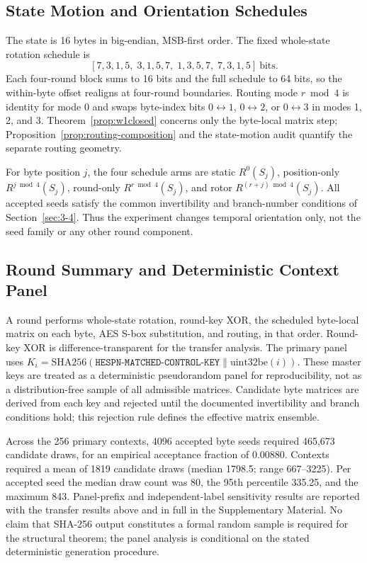 \documentclass[cryptography,article,submit,oneauthor]{Definitions/mdpi}
\begin{document}
\subsection{State Motion and Orientation Schedules}\label{sec:4-1}
The state is 16 bytes in big-endian, MSB-first order. The fixed whole-state rotation schedule is
\[
[7,3,1,5,\;3,1,5,7,\;1,3,5,7,\;7,3,1,5]\ \text{bits}.
\]
Each four-round block sums to 16 bits and the full schedule to 64 bits, so the within-byte offset realigns at four-round boundaries. Routing mode $r\bmod4$ is identity for mode 0 and swaps byte-index bits $0\leftrightarrow1$, $0\leftrightarrow2$, or $0\leftrightarrow3$ in modes 1, 2, and 3. Theorem~\ref{prop:w1closed} concerns only the byte-local matrix step; Proposition~\ref{prop:routing-composition} and the state-motion audit quantify the separate routing geometry.

For byte position $j$, the four schedule arms are static $R^0(S_j)$, position-only $R^{j\bmod4}(S_j)$, round-only $R^{r\bmod4}(S_j)$, and rotor $R^{(r+j)\bmod4}(S_j)$. All accepted seeds satisfy the common invertibility and branch-number conditions of Section~\ref{sec:3-4}. Thus the experiment changes temporal orientation only, not the seed family or any other round component.

\subsection{Round Summary and Deterministic Context Panel}\label{sec:4-2}
A round performs whole-state rotation, round-key XOR, the scheduled byte-local matrix on each byte, AES S-box substitution, and routing, in that order. Round-key XOR is difference-transparent for the transfer analysis. The primary panel uses $K_i=\mathrm{SHA256}(\texttt{HESPN-MATCHED-CONTROL-KEY}\parallel\mathrm{uint32be}(i))$. These master keys are treated as a deterministic pseudorandom panel for reproducibility, not as a distribution-free sample of all admissible matrices. Candidate byte matrices are derived from each key and rejected until the documented invertibility and branch conditions hold; this rejection rule defines the effective matrix ensemble.

Across the 256 primary contexts, 4096 accepted byte seeds required 465,673 candidate draws, for an empirical acceptance fraction of $0.00880$. Contexts required a mean of 1819 candidate draws (median 1798.5; range 667--3225). Per accepted seed the median draw count was 80, the 95th percentile 335.25, and the maximum 843. Panel-prefix and independent-label sensitivity results are reported with the transfer results above and in full in the Supplementary Material. No claim that SHA-256 output constitutes a formal random sample is required for the structural theorem; the panel analysis is conditional on the stated deterministic generation procedure.
\end{document}
